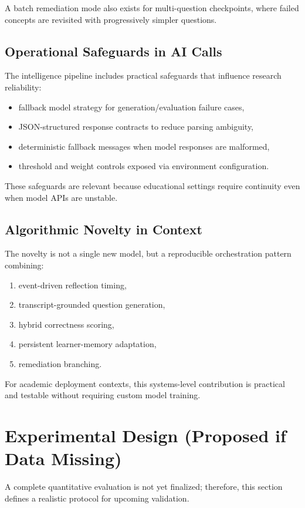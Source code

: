 \documentclass[conference]{IEEEtran}
\begin{document}
A batch remediation mode also exists for multi-question checkpoints, where failed concepts are revisited with progressively simpler questions.

\subsection{Operational Safeguards in AI Calls}
The intelligence pipeline includes practical safeguards that influence research reliability:
\begin{itemize}
\item fallback model strategy for generation/evaluation failure cases,
\item JSON-structured response contracts to reduce parsing ambiguity,
\item deterministic fallback messages when model responses are malformed,
\item threshold and weight controls exposed via environment configuration.
\end{itemize}

These safeguards are relevant because educational settings require continuity even when model APIs are unstable.

\subsection{Algorithmic Novelty in Context}
The novelty is not a single new model, but a reproducible orchestration pattern combining:
\begin{enumerate}
\item event-driven reflection timing,
\item transcript-grounded question generation,
\item hybrid correctness scoring,
\item persistent learner-memory adaptation,
\item remediation branching.
\end{enumerate}

For academic deployment contexts, this systems-level contribution is practical and testable without requiring custom model training.

\section{Experimental Design (Proposed if Data Missing)}
A complete quantitative evaluation is not yet finalized; therefore, this section defines a realistic protocol for upcoming validation.
\end{document}
